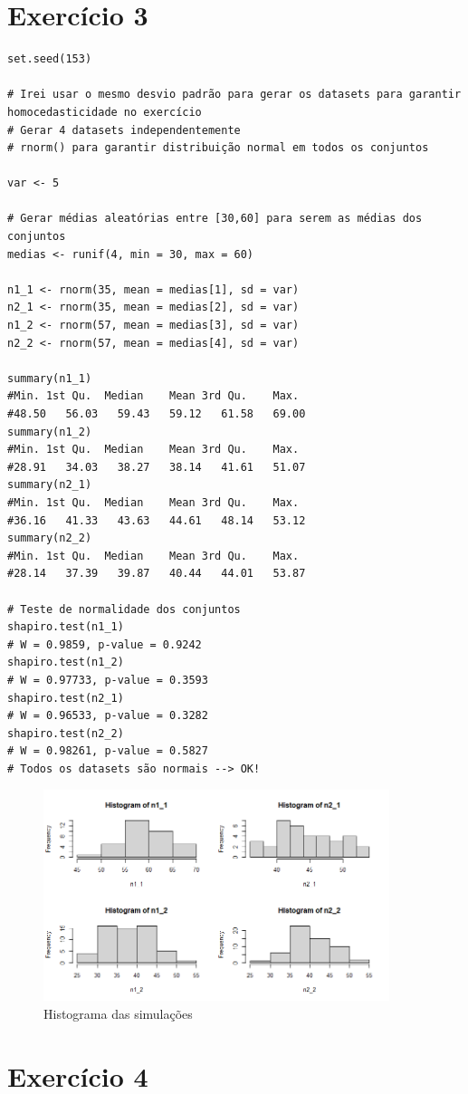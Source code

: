 \documentclass{article}
\begin{document}
\section{Exercício 3}

\begin{lstlisting}
set.seed(153)

# Irei usar o mesmo desvio padrão para gerar os datasets para garantir homocedasticidade no exercício
# Gerar 4 datasets independentemente
# rnorm() para garantir distribuição normal em todos os conjuntos

var <- 5

# Gerar médias aleatórias entre [30,60] para serem as médias dos conjuntos
medias <- runif(4, min = 30, max = 60) 

n1_1 <- rnorm(35, mean = medias[1], sd = var)
n2_1 <- rnorm(35, mean = medias[2], sd = var)
n1_2 <- rnorm(57, mean = medias[3], sd = var)
n2_2 <- rnorm(57, mean = medias[4], sd = var)

summary(n1_1)
#Min. 1st Qu.  Median    Mean 3rd Qu.    Max. 
#48.50   56.03   59.43   59.12   61.58   69.00 
summary(n1_2)
#Min. 1st Qu.  Median    Mean 3rd Qu.    Max. 
#28.91   34.03   38.27   38.14   41.61   51.07 
summary(n2_1)
#Min. 1st Qu.  Median    Mean 3rd Qu.    Max. 
#36.16   41.33   43.63   44.61   48.14   53.12 
summary(n2_2)
#Min. 1st Qu.  Median    Mean 3rd Qu.    Max. 
#28.14   37.39   39.87   40.44   44.01   53.87

# Teste de normalidade dos conjuntos
shapiro.test(n1_1)
# W = 0.9859, p-value = 0.9242
shapiro.test(n1_2)
# W = 0.97733, p-value = 0.3593
shapiro.test(n2_1)
# W = 0.96533, p-value = 0.3282
shapiro.test(n2_2)
# W = 0.98261, p-value = 0.5827
# Todos os datasets são normais --> OK!
\end{lstlisting}

\begin{figure}[h]
    \centering
    \includegraphics[width=0.9\textwidth]{figures/ex3.png} %
    \caption{Histograma das simulações}
    \label{fig3}
\end{figure}

\section{Exercício 4}
\end{document}
